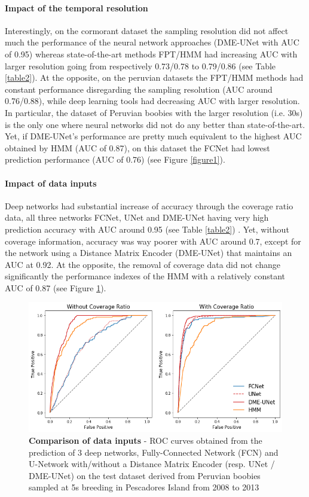 \documentclass{article}
\begin{document}
\paragraph{Impact of the temporal resolution}
Interestingly, on the cormorant dataset the sampling resolution did not affect much the performance of the neural network approaches (DME-UNet with AUC of 0.95) whereas state-of-the-art methods FPT/HMM had increasing AUC with larger resolution going from respectively 0.73/0.78 to 0.79/0.86 (see Table \ref{table2}).
At the opposite, on the peruvian datasets the FPT/HMM methods had constant performance disregarding the sampling resolution (AUC around 0.76/0.88), while deep learning tools had decreasing AUC with larger resolution. In particular, the dataset of Peruvian boobies with the larger resolution (i.e. 30s) is the only one where neural networks did not do any better than state-of-the-art. Yet, if DME-UNet's performance are pretty much equivalent to the highest AUC obtained by HMM (AUC of 0.87), on this dataset the FCNet had lowest prediction performance (AUC of 0.76) (see Figure \ref{figure1}).

\paragraph{Impact of data inputs}
Deep networks had substantial increase of accuracy through the coverage ratio data, all three networks FCNet, UNet and DME-UNet having very high prediction accuracy with AUC around 0.95 (see Table \ref{table2}) .
Yet, without coverage information, accuracy was way poorer with AUC around 0.7, except for the network using a Distance Matrix Encoder (DME-UNet) that maintains an AUC at 0.92.
At the opposite, the removal of coverage data did not change significantly the performance indexes of the HMM with a relatively constant AUC of 0.87 (see Figure \ref{figure2}).

\begin{figure}[!h]
  \centering
  \includegraphics[scale=0.5]{figure2.png}
  \caption{\textbf{Comparison of data inputs} - ROC curves obtained from the prediction of 3 deep networks, Fully-Connected Network (FCN) and U-Network with/without a Distance Matrix Encoder (resp. UNet / DME-UNet) on the test dataset derived from Peruvian boobies sampled at 5s breeding in Pescadores Island from 2008 to 2013}
  \label{figure2}
\end{figure}
\end{document}
